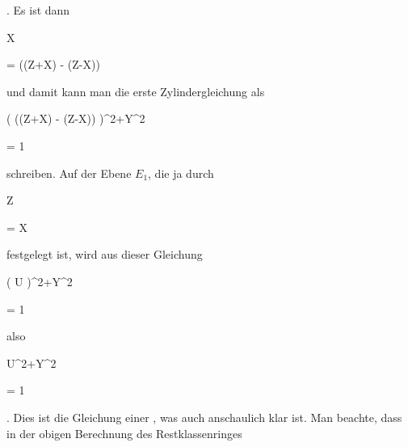{{{  }{
}


{    }{
}


{   }{
}


}
{}{}{.}
Es ist dann


\mavergleichskette


{\vergleichskette


{ X
}


{ = }{  ((Z+X) - (Z-X))
}


{  }{
}


{    }{
}


{   }{
}


}
{}{}{}
und damit kann man die erste Zylindergleichung als


\mavergleichskettedisp


{\vergleichskette


{ \left(   ((Z+X) - (Z-X))  \right)^2+Y^2
}


{ =} { 1
}


{ } {
}


{ } {
}


{ } {
}


}
{}{}{}
schreiben. Auf der Ebene $E_1$, die ja durch


\mavergleichskette


{\vergleichskette


{ Z
}


{ = }{ X
}


{  }{
}


{    }{
}


{   }{
}


}
{}{}{}
festgelegt ist, wird aus dieser Gleichung


\mavergleichskettedisp


{\vergleichskette


{ \left(   U  \right)^2+Y^2
}


{ =} { 1
}


{ } {
}


{ } {
}


{ } {
}


}
{}{}{}
also


\mavergleichskette


{\vergleichskette


{ U^2+Y^2
}


{ = }{ 1
}


{  }{
}


{    }{
}


{   }{
}


}
{}{}{.}
Dies ist die Gleichung einer  {,} was auch anschaulich klar ist. Man beachte, dass in der obigen Berechnung des Restklassenringes


}
